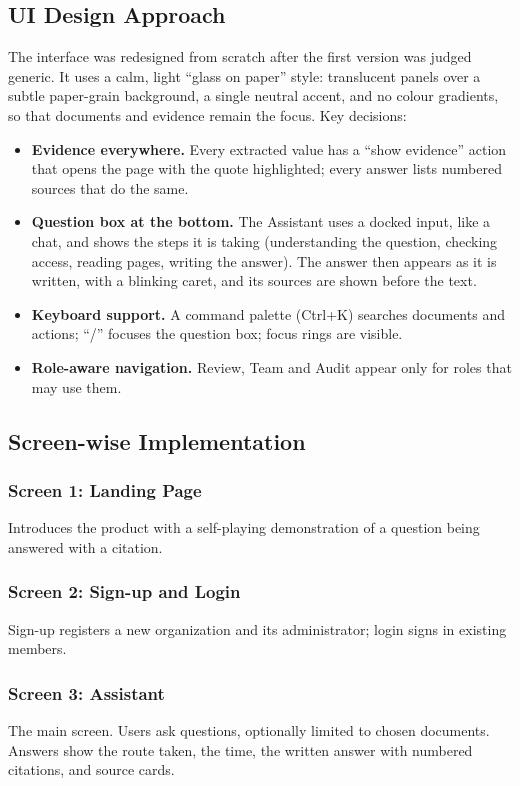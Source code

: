 \subsection{UI Design Approach}
The interface was redesigned from scratch after the first version was judged generic. It uses a calm,
light ``glass on paper'' style: translucent panels over a subtle paper-grain background, a single neutral
accent, and no colour gradients, so that documents and evidence remain the focus. Key decisions:
\begin{itemize}
\item \textbf{Evidence everywhere.} Every extracted value has a ``show evidence'' action that opens the
page with the quote highlighted; every answer lists numbered sources that do the same.
\item \textbf{Question box at the bottom.} The Assistant uses a docked input, like a chat, and shows the
steps it is taking (understanding the question, checking access, reading pages, writing the answer).
The answer then appears as it is written, with a blinking caret, and its sources are shown before the text.
\item \textbf{Keyboard support.} A command palette (Ctrl+K) searches documents and actions; ``/''
focuses the question box; focus rings are visible.
\item \textbf{Role-aware navigation.} Review, Team and Audit appear only for roles that may use them.
\end{itemize}

\subsection{Screen-wise Implementation}
\subsubsection{Screen 1: Landing Page}
Introduces the product with a self-playing demonstration of a question being answered with a citation.

\subsubsection{Screen 2: Sign-up and Login}
Sign-up registers a new organization and its administrator; login signs in existing members.

\subsubsection{Screen 3: Assistant}
The main screen. Users ask questions, optionally limited to chosen documents. Answers show the route
taken, the time, the written answer with numbered citations, and source cards.

